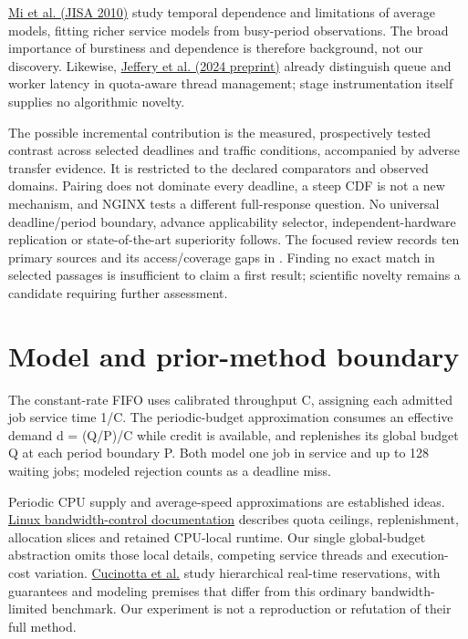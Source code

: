 \documentclass[11pt,a4paper]{article}
\begin{document}
\href{https://link.springer.com/content/pdf/10.1007/s13174-010-0012-9.pdf}{Mi et al. (JISA 2010)}
study temporal dependence and limitations of average models, fitting richer
service models from busy-period observations. The broad importance of
burstiness and dependence is therefore background, not our discovery.
Likewise, \href{https://arxiv.org/html/2407.11582v1}{Jeffery et al. (2024 preprint)}
already distinguish queue and worker latency in quota-aware thread management;
stage instrumentation itself supplies no algorithmic novelty.

The possible incremental contribution is the measured, prospectively tested
contrast across selected deadlines and traffic conditions, accompanied by
adverse transfer evidence. It is restricted to the declared comparators and
observed domains. Pairing does not dominate every deadline, a steep CDF is
not a new mechanism, and NGINX tests a different full-response question.
No universal deadline/period boundary, advance applicability selector,
independent-hardware replication or state-of-the-art superiority follows.
The focused review records ten primary sources and its access/coverage gaps
in .
Finding no exact match in selected passages is insufficient to claim a first
result; scientific novelty remains a candidate requiring further assessment.

\section{Model and prior-method boundary}

The constant-rate FIFO uses calibrated throughput C, assigning each admitted
job service time 1/C. The periodic-budget approximation consumes an effective
demand d = (Q/P)/C while credit is available, and replenishes its global budget
Q at each period boundary P. Both model one job in service and up to 128 waiting
jobs; modeled rejection counts as a deadline miss.

Periodic CPU supply and average-speed approximations are established ideas.
\href{https://docs.kernel.org/scheduler/sched-bwc.html}{Linux bandwidth-control documentation}
describes quota ceilings, replenishment, allocation slices and retained
CPU-local runtime. Our single global-budget abstraction omits those local
details, competing service threads and execution-cost variation.
\href{https://retis.santannapisa.it/people/nino/publication/TCC23.pdf}{Cucinotta et al.}
study hierarchical real-time reservations, with guarantees and modeling
premises that differ from this ordinary bandwidth-limited benchmark. Our
experiment is not a reproduction or refutation of their full method.
\end{document}
